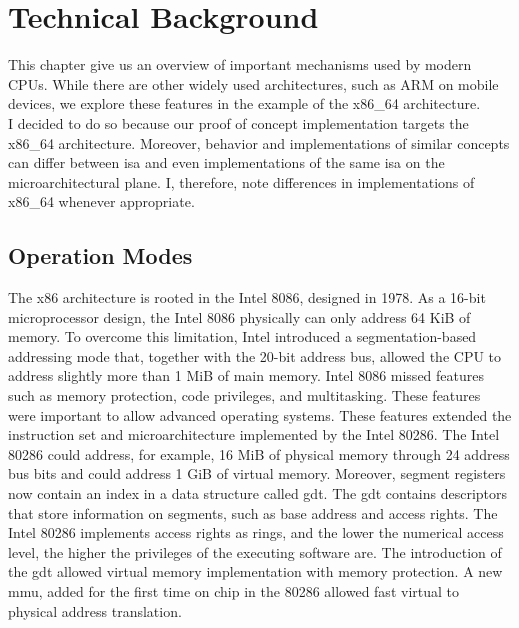 \section{Technical Background}
\label{sec:state:technical}
This chapter give us an overview of important mechanisms used by modern CPUs.
While there are other widely used architectures, such as ARM on mobile devices,
we explore these features in the example of the x86\_64 architecture. \\

I decided to do so because our proof of concept implementation targets the
x86\_64 architecture. Moreover, behavior and implementations of similar concepts
can differ between \gls{isa} and even implementations of the
same \gls{isa} on the microarchitectural plane. I, therefore, note
differences in implementations of x86\_64 whenever appropriate.

\subsection{Operation Modes}
\label{sec:state:technical:modes}
The x86 architecture is rooted in the Intel 8086, designed in 1978. As a 16-bit
microprocessor design, the Intel 8086 physically can only address 64 KiB of
memory. To overcome this limitation, Intel introduced a segmentation-based
addressing mode that, together with the 20-bit address bus, allowed the CPU to
address slightly more than 1 MiB of main memory. Intel 8086 missed features such
as memory protection, code privileges, and multitasking. These features were
important to allow advanced operating systems. These features extended the
instruction set and microarchitecture implemented by the Intel 80286. The Intel
80286 could address, for example, 16 MiB of physical memory through 24 address
bus bits and could address 1 GiB of virtual memory. Moreover, segment registers
now contain an index in a data structure called \gls{gdt}. The \gls{gdt} contains descriptors that store
information on segments, such as base address and access rights. The Intel 80286
implements access rights as rings, and the lower the numerical access level, the
higher the privileges of the executing software are. The introduction of the
\gls{gdt} allowed virtual memory implementation with memory protection. A
new \gls{mmu}, added for the first time on chip in the
80286 allowed fast virtual to physical address translation. \\

